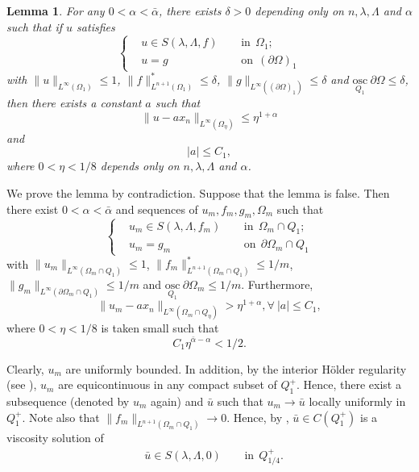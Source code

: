 \documentclass[preprint,12pt]{elsarticle}
\newtheorem{lemma}[theorem]{Lemma}
\theoremstyle{definition}
\theoremstyle{remark}
\numberwithin{equation}{section}
\begin{document}
\begin{lemma}\label{L.K1}
For any $0<\alpha<\bar{\alpha}$, there exists $\delta>0$ depending only on $n, \lambda,\Lambda$ and $\alpha$ such that if $u$ satisfies
\begin{equation*}
\left\{\begin{aligned}
&u\in S(\lambda,\Lambda,f)&& ~~\mbox{in}~~\Omega_1;\\
&u=g&& ~~\mbox{on}~~(\partial \Omega)_1
\end{aligned}\right.
\end{equation*}
with $\|u\|_{L^{\infty}(\Omega_1)}\leq 1$, $\|f\|^{*}_{L^{n+1}(\Omega_1)}\leq \delta$, $\|g\|_{L^{\infty}((\partial \Omega)_1)}\leq \delta$
and $\underset{Q_1}{\mathrm{osc}}~\partial\Omega \leq \delta$, then there exists a constant $a$ such that
\begin{equation*}\label{e.lK1.1}
  \|u-ax_n\|_{L^{\infty}(\Omega_{\eta})}\leq \eta^{1+\alpha}
\end{equation*}
and
\begin{equation*}\label{e.lK1.2}
|a|\leq C_1,
\end{equation*}
where $0<\eta<1/8$ depends only on $n,\lambda,\Lambda$ and $\alpha$.
\end{lemma}

\proof We prove the lemma by contradiction. Suppose that the lemma is false. Then there exist $0<\alpha<\bar{\alpha}$ and sequences of $u_m,f_m,g_m,\Omega_m$ such that
\begin{equation*}
\left\{\begin{aligned}
&u_m\in S(\lambda,\Lambda,f_m)&& ~~\mbox{in}~~\Omega_m\cap Q_1;\\
&u_m=g_m&& ~~\mbox{on}~~\partial \Omega_m\cap Q_1
\end{aligned}\right.
\end{equation*}
with $\|u_m\|_{L^{\infty}(\Omega_m\cap Q_1)}\leq 1$,
$\|f_m\|^{*}_{L^{n+1}(\Omega_m\cap Q_1)}\leq 1/m$, $\|g_m\|_{L^{\infty}(\partial \Omega_m\cap Q_1)}\leq 1/m$
and $\underset{Q_1}{\mathrm{osc}}~\partial\Omega_m\leq 1/m$. Furthermore,
\begin{equation}\label{e.key1}
  \|u_m-ax_n\|_{L^{\infty}(\Omega_{m}\cap Q_{\eta})}> \eta^{1+\alpha}, \forall~|a|\leq C_1,
\end{equation}
where $0<\eta<1/8$ is taken small such that
\begin{equation}\label{e.key2}
C_1\eta^{\bar{\alpha}-\alpha}<1/2.
\end{equation}

Clearly, $u_m$ are uniformly bounded. In addition, by the interior H\"{o}lder regularity (see \cite[Theorem 4.19]{MR1135923}), $u_m$ are equicontinuous in any compact subset of $Q_1^+$. Hence, there exist a subsequence (denoted by $u_m$ again) and $\bar u$ such that $u_m\rightarrow \bar u$ locally uniformly in $Q_1^+$. Note also that $\|f_m\|_{L^{n+1}(\Omega_m\cap Q_1)}\rightarrow 0$. Hence, by , $\bar u\in C(Q_1^+)$ is a viscosity solution of
\begin{equation*}
\begin{aligned}
&\bar u\in S(\lambda,\Lambda,0)&& ~~\mbox{in}~~Q_{1/4}^+.
\end{aligned}
\end{equation*}
\end{document}
